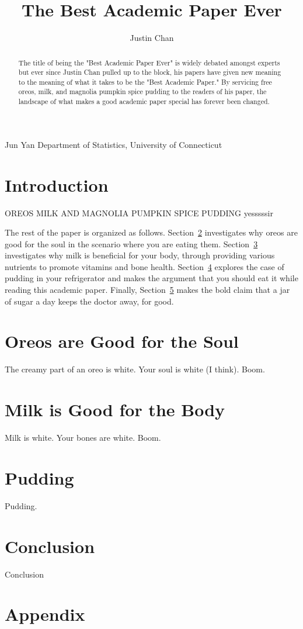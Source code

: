 \documentclass[12pt, letterpaper]{article}
\begin{document}
\title{The Best Academic Paper Ever}

\author{Justin Chan}
Jun Yan
Department of Statistics, University of Connecticut

\begin{abstract}
The title of being the "Best Academic Paper Ever" is widely debated amongst experts but ever since Justin Chan pulled up to the block, his papers have given new meaning to the meaning of what it takes to be the "Best Academic Paper." By servicing free oreos, milk, and magnolia pumpkin spice pudding to the readers of his paper, the landscape of what makes a good academic paper special has forever been changed.

\end{abstract}

\section{Introduction}
OREOS MILK AND MAGNOLIA PUMPKIN SPICE PUDDING yesssssir

The rest of the paper is organized as follows. Section~\ref{sec:oreos} investigates why oreos are good 
for the soul in the scenario where you are eating them. Section~\ref{sec:milk} investigates why milk is 
beneficial for your body, through providing various nutrients to promote vitamins and bone health. 
Section~\ref{sec:pudding} explores the case of pudding in your refrigerator and makes the argument 
that you should eat it while reading this academic paper. Finally, Section~\ref{sec:conclusion} makes 
the bold claim that a jar of sugar a day keeps the doctor away, for good.

\section{Oreos are Good for the Soul} \label{sec:oreos}

The creamy part of an oreo is white. Your soul is white (I think). Boom.

\section{Milk is Good for the Body} \label{sec:milk}

Milk is white. Your bones are white. Boom.

\section{Pudding} \label{sec:pudding}

Pudding.

\section{Conclusion} \label{sec:conclusion}

Conclusion

\appendix

\section{Appendix}



\end{document}
